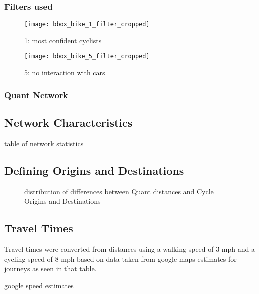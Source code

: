 \subsubsection{Filters used}

\begin{figure}
  \centering
  \texttt{[image: bbox\_bike\_1\_filter\_cropped]}
  \caption{1: most confident cyclists}
  \label{fig:sub1}
\end{figure}

\begin{figure}
  \centering
  \texttt{[image: bbox\_bike\_5\_filter\_cropped]}
  \caption{5: no interaction with cars }
  \label{fig:sub2}
\end{figure}


\subsubsection{Quant Network}



\subsection{Network Characteristics}

\begin{table}
\centering
\caption{table of network statistics}
\label{table:network_stats}
\end{table}

\subsection{Defining Origins and Destinations}

\begin{figure}
\centering
\caption{distribution of differences between Quant distances and Cycle Origins and Destinations}
\label{fig:diff_dist}
\end{figure}

\subsection{Travel Times}

Travel times were converted from distances using a walking speed of 3 mph and a cycling speed of 8 mph based on data taken from google maps estimates for journeys as seen in that table. 

\begin{table}
\centering
\caption{google speed estimates}
\label{table:google_speeds}
\end{table}


